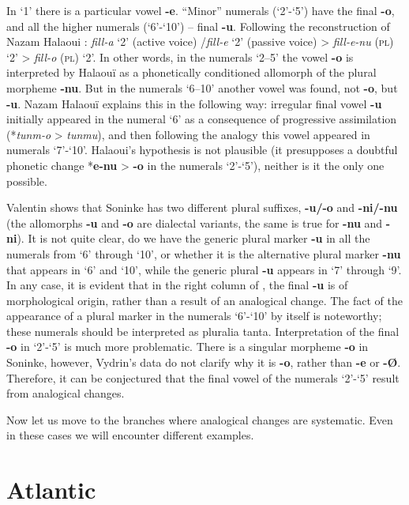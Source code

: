 In ‘1’ there is a particular vowel \textbf{-e}. “Minor” numerals (‘2’-‘5’) have the final \textbf{-o}, and all the higher numerals (‘6’-‘10’) – final \textbf{-u}.  Following the reconstruction of Nazam Halaoui \citep{Halaouï1990}: \textit{fill-a} ‘2’ (active voice) /\textit{fill-e} ‘2’ (passive voice) > \textit{fill-e-nu} (\textsc{pl})  ‘2’ > \textit{fill-o} (\textsc{pl}) ‘2’. In other words, in the numerals ‘2--5’ the vowel \textbf{-o} is interpreted by Halaouï as a phonetically conditioned allomorph of the plural morpheme \textbf{-nu}. But in the numerals ‘6--10’ another vowel was found, not \textbf{-o}, but \textbf{-u}. Nazam Halaouï explains this in the following way: irregular final vowel \textbf{-u} initially appeared in the numeral ‘6’ as a consequence of progressive assimilation (*\textit{tunm-o} > \textit{tunmu}), and then following the analogy this vowel appeared in numerals ‘7’-‘10’. Halaoui’s hypothesis is not plausible (it presupposes a doubtful phonetic change *\textbf{e-nu} > \textbf{-o} in the numerals ‘2’-‘5’), neither is it the only one possible. 

Valentin \citet[171--204]{Vydrin2006} shows that Soninke has two different plural suffixes, \textbf{-u/-o} and \textbf{-ni/-nu} (the allomorphs \textbf{-u} and \textbf{-o} are dialectal variants, the same is true for \textbf{-nu} and \textbf{-ni}). It is not quite clear, do we have the generic plural marker  \textbf{-u} in all the numerals from ‘6’ through ‘10’, or whether it is the alternative plural marker \textbf{-nu} that appears in ‘6’ and ‘10’, while the generic plural \textbf{-u} appears in ‘7’ through ‘9’. In any case, it is evident that in the right column of , the final \textbf{-u} is of morphological origin, rather than a result of an analogical change. The fact of the appearance of a plural marker in the numerals ‘6’-‘10’ by itself is noteworthy; these numerals should be interpreted as pluralia tanta. Interpretation of the final \textbf{-o} in ‘2’-‘5’ is much more problematic. There is a singular morpheme \textbf{-o} in Soninke, however, Vydrin's data do not clarify why it is \textbf{-o}, rather than \textbf{-e} or \textbf{-Ø}. Therefore, it can be conjectured that the final vowel of the numerals ‘2’-‘5’ result from analogical changes.

Now let us move to the branches where analogical changes are systematic. Even in these cases we will encounter different examples.

 
\section{Atlantic}%

